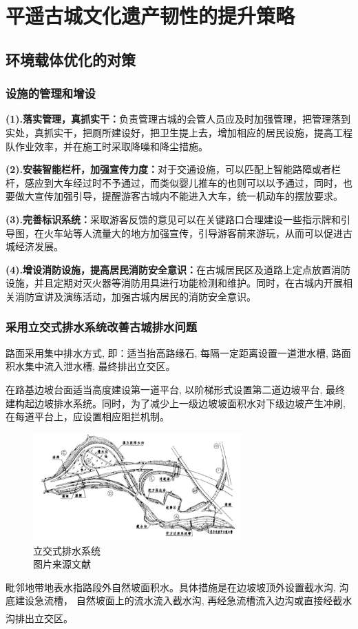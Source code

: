 \documentclass[UTF8]{ctexart}
\newcommand{\upcite}[1]{\textsuperscript{\textsuperscript{\cite{#1}}}}
\begin{document}
\section{平遥古城文化遗产韧性的提升策略}
    \subsection{环境载体优化的对策}
        \subsubsection{设施的管理和增设}
        \textbf{(1).落实管理，真抓实干：}负责管理古城的会管人员应及时加强管理，把管理落到实处，真抓实干，把厕所建设好，把卫生提上去，增加相应的居民设施，提高工程队作业效率，并在施工时采取降噪和降尘措施。

        \textbf{(2).安装智能栏杆，加强宣传力度：}对于交通设施，可以匹配上智能路障或者栏杆，感应到大车经过时不予通过，而类似婴儿推车的也则可以以予通过，同时，也要做大宣传加强引导，提醒游客古城内不能进入大车，统一机动车的摆放要求。
        
        \textbf{(3).完善标识系统：}采取游客反馈的意见可以在关键路口合理建设一些指示牌和引导图，在火车站等人流量大的地方加强宣传，引导游客前来游玩，从而可以促进古城经济发展。
        
        \textbf{(4).增设消防设施，提高居民消防安全意识：}在古城居民区及道路上定点放置消防设施，并且定期对灭火器等消防用具进行功能检测和维护。同时，在古城内开展相关消防宣讲及演练活动，加强古城内居民的消防安全意识。
        
        \subsubsection{采用立交式排水系统改善古城排水问题}
                路面采用集中排水方式, 即：适当抬高路缘石, 每隔一定距离设置一道泄水槽, 路面积水集中流入泄水槽, 最终排出立交区。
        
                在路基边坡台面适当高度建设第一道平台, 以阶梯形式设置第二道边坡平台, 最终建构起边坡排水系统。同时，为了减少上一级边坡坡面积水对下级边坡产生冲刷, 在每道平台上，应设置相应阻拦机制。
                \begin{figure}[H]
            \centering
            \includegraphics[width=8cm]{排水.png}
            \caption[plain]{立交式排水系统\\图片来源文献\cite{魏明祥2002丹东古城互通式立交的排水设计}}
    
            \end{figure}
                毗邻地带地表水指路段外自然坡面积水。具体措施是在边坡坡顶外设置截水沟, 沟底建设急流槽， 自然坡面上的流水流入截水沟, 再经急流槽流入边沟或直接经截水沟排出立交区。\upcite{赵阔宇2011浅谈边坡生态防护技术在古城墙保护中绿化的应用}
\end{document}
